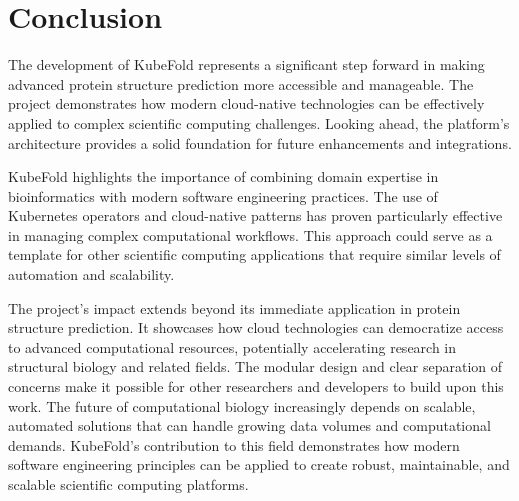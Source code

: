 \section{Conclusion}

The development of KubeFold represents a significant step forward in making advanced protein structure prediction more accessible and manageable. The project demonstrates how modern cloud-native technologies can be effectively applied to complex scientific computing challenges. Looking ahead, the platform's architecture provides a solid foundation for future enhancements and integrations.

KubeFold highlights the importance of combining domain expertise in bioinformatics with modern software engineering practices. The use of Kubernetes operators and cloud-native patterns has proven particularly effective in managing complex computational workflows. This approach could serve as a template for other scientific computing applications that require similar levels of automation and scalability.

The project's impact extends beyond its immediate application in protein structure prediction. It showcases how cloud technologies can democratize access to advanced computational resources, potentially accelerating research in structural biology and related fields. The modular design and clear separation of concerns make it possible for other researchers and developers to build upon this work. The future of computational biology increasingly depends on scalable, automated solutions that can handle growing data volumes and computational demands. KubeFold's contribution to this field demonstrates how modern software engineering principles can be applied to create robust, maintainable, and scalable scientific computing platforms. 